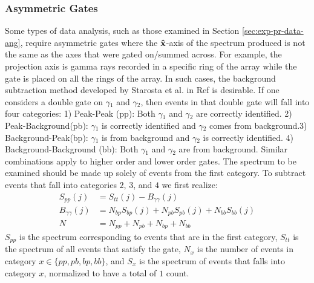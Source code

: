\subsubsection{Asymmetric Gates}
\label{sssec:exp-pr-data-proc-bg-sub-asym}
Some types of data analysis, such as those examined in Section \ref{sec:exp-pr-data-ang}, require asymmetric gates where the $\boldsymbol{\hat{\textbf{x}}}$-axis of the spectrum produced is not the same as the axes that were gated on/summed across. For example, the projection axis is gamma rays recorded in a specific ring of the array while the gate is placed on all the rings of the array. In such cases, the background subtraction method developed by Starosta et al. in Ref \cite{asymBGSub} is desirable. If one considers a double gate on $\gamma{}_1$ and $\gamma{}_2$, then events in that double gate will fall into four categories: 1) Peak-Peak (pp): Both $\gamma{}_1$ and $\gamma{}_2$ are correctly identified. 2) Peak-Background(pb): $\gamma{}_1$ is correctly identified and $\gamma{}_2$ comes from background.3) Background-Peak(bp): $\gamma{}_1$ is from background and $\gamma{}_2$ is correctly identified. 4) Background-Background (bb): Both $\gamma{}_1$ and $\gamma{}_2$ are from background. Similar combinations apply to higher order and lower order gates. The spectrum to be examined should be made up solely of events from the first category. To subtract events that fall into categories $2$, $3$, and $4$ we first realize:
\begin{align}
S_{pp}(j) &= S_{tt}(j) - B_{\gamma{}\gamma{}}(j)\label{eqn:chp3-asym-pp}\\
B_{\gamma{}\gamma{}}(j) &= N_{bp}S_{bp}(j) + N_{pb}S_{pb}(j) + N_{bb}S_{bb}(j)\label{eqn:chp3-asym-gg}\\
N &= N_{pp} + N_{pb} + N_{bp} + N_{bb} \label{eqn:chp3-asym-N}
\end{align}
$S_{pp}$ is the spectrum corresponding to events that are in the first category, $S_{tt}$ is the spectrum of all events that satisfy the gate, $N_{x}$ is the number of events in category $x\in{}\{pp,pb,bp,bb\}$, and $S_{x}$ is the spectrum of events that falls into category $x$, normalized to have a total of $1$ count.

